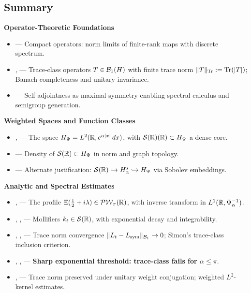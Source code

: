 \subsection*{Summary}
\label{sec:foundations_summary}

\textbf{Operator-Theoretic Foundations}
\begin{itemize}
  \item {} — Compact operators: norm limits of finite-rank maps with discrete spectrum.
  \item {},  — Trace-class operators \( T \in \mathcal{B}_1(H) \) with finite trace norm \( \|T\|_{\operatorname{Tr}} := \operatorname{Tr}(|T|) \); Banach completeness and unitary invariance.
  \item {} — Self-adjointness as maximal symmetry enabling spectral calculus and semigroup generation.
\end{itemize}

\textbf{Weighted Spaces and Function Classes}
\begin{itemize}
  \item {},  — The space \( H_{\Psi} = L^2(\mathbb{R}, e^{\alpha|x|}\,dx) \), with \( \mathcal{S}(\mathbb{R})(\mathbb{R}) \subset H_{\Psi} \) a dense core.
  \item {} — Density of \( \mathcal{S}(\mathbb{R}) \subset H_{\Psi} \) in norm and graph topology.
  \item {} — Alternate justification: \( \mathcal{S}(\mathbb{R}) \hookrightarrow H^s_\alpha \hookrightarrow H_{\Psi} \) via Sobolev embeddings.
\end{itemize}

\textbf{Analytic and Spectral Estimates}
\begin{itemize}
  \item {},  — The profile \( \Xi(\tfrac{1}{2} + i\lambda) \in \mathcal{PW}_{\pi}(\mathbb{R}) \), with inverse transform in \( L^1(\mathbb{R}, \Psi_\alpha^{-1}) \).
  \item {}, ,  — Mollifiers \( k_t \in \mathcal{S}(\mathbb{R}) \), with exponential decay and integrability.
  \item {}, ,  — Trace norm convergence \( \|L_t - L_{\mathrm{sym}}\|_{\mathcal{B}_1} \to 0 \); Simon’s trace-class inclusion criterion.
  \item {}, ,  — \textbf{Sharp exponential threshold: trace-class fails for \( \alpha \le \pi \)}.
  \item {},  — Trace norm preserved under unitary weight conjugation; weighted \( L^2 \)-kernel estimates.
\end{itemize}

